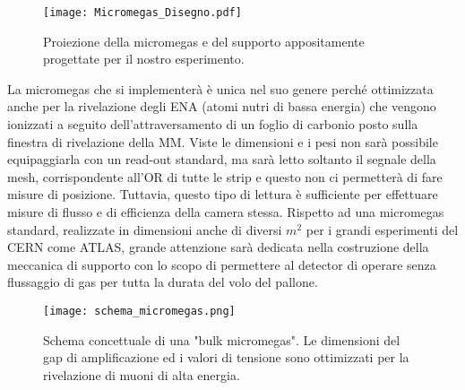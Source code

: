 \begin{figure}[!h]
    \centering
    \texttt{[image: Micromegas\_Disegno.pdf]}
    \caption{Proiezione della micromegas e del supporto appositamente progettate per il nostro esperimento.}
    \label{Micromegas_Disegno}
\end{figure}

La micromegas che si implementerà è unica nel suo genere perché ottimizzata anche per la rivelazione degli ENA (atomi nutri di bassa energia) che vengono ionizzati a seguito dell'attraversamento di un foglio di carbonio posto sulla finestra di rivelazione della MM. 
Viste le dimensioni e i pesi non sarà possibile equipaggiarla con un read-out standard, ma sarà letto soltanto il segnale della mesh, corrispondente all’OR di tutte le strip e questo non ci permetterà di fare misure di posizione. Tuttavia, questo tipo di lettura è sufficiente per effettuare misure di flusso e di efficienza della camera stessa. Rispetto ad una micromegas standard, realizzate in dimensioni anche di diversi $m^2$ per i grandi esperimenti del CERN come ATLAS, grande attenzione sarà dedicata nella costruzione della meccanica di supporto con lo scopo di permettere al detector di operare senza flussaggio di gas per tutta la durata del volo del pallone. 
 
\begin{figure}
	\centering
    \texttt{[image: schema\_micromegas.png]}
    \caption{Schema concettuale di una "bulk micromegas". Le dimensioni del gap di amplificazione ed i valori di tensione sono ottimizzati per la rivelazione di muoni di alta energia.}
    \label{fisica_micromegas}
\end{figure}

